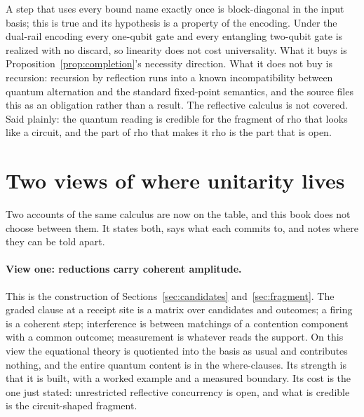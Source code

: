 \begin{remark}
\label{rmk:linear}
A step that uses every bound name exactly once is block-diagonal in the input
basis; this is true and its hypothesis is a property of the encoding.  Under
the dual-rail encoding every one-qubit gate and every entangling two-qubit
gate is realized with no discard, so linearity does not cost universality.
What it buys is Proposition~\ref{prop:completion}'s necessity direction.
What it does not buy is recursion: recursion by reflection runs into a known
incompatibility between quantum alternation and the standard fixed-point
semantics, and the source files this as an obligation rather than a result.
The reflective calculus is not covered.  Said plainly: the quantum reading
is credible for the fragment of rho that looks like a circuit, and the part
of rho that makes it rho is the part that is open.
\end{remark}

\section{Two views of where unitarity lives}
\label{sec:coherence}
\label{sec:twoviews}

Two accounts of the same calculus are now on the table, and this book does
not choose between them.  It states both, says what each commits to, and
notes where they can be told apart.

\paragraph{View one: reductions carry coherent amplitude.}
This is the construction of Sections~\ref{sec:candidates}
and~\ref{sec:fragment}.  The graded clause at a receipt site is a matrix
over candidates and outcomes; a firing is a coherent step; interference is
between matchings of a contention component with a common outcome;
measurement is whatever reads the support.  On this view the equational
theory is quotiented into the basis as usual and contributes nothing, and
the entire quantum content is in the where-clauses.  Its strength is that
it is built, with a worked example and a measured boundary.  Its cost is
the one just stated: unrestricted reflective concurrency is open, and what
is credible is the circuit-shaped fragment.

